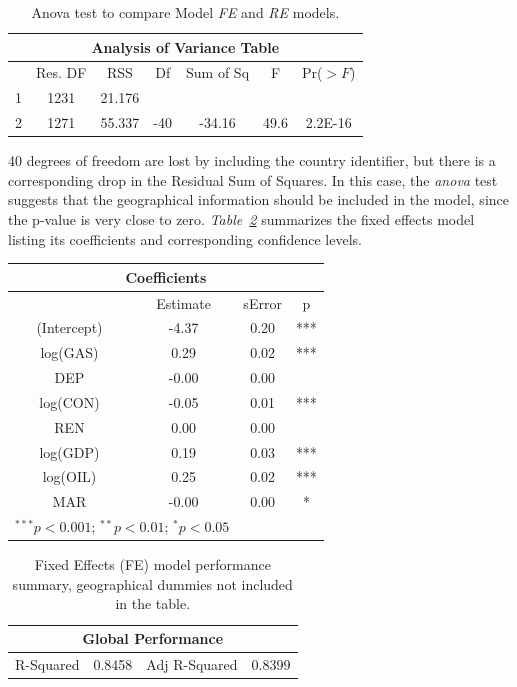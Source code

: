 \documentclass[a4paper,12pt]{book}
\begin{document}
\bigskip
\begin{table}[tb]
\begin{center}
\begin{tabular}{|c|c|c|c|c|c|c|}
\hline
\multicolumn{7}{|c|}{Analysis of Variance Table}\\
\hline
&Res. DF&RSS&Df&Sum of Sq&F&Pr($>F$)\\
\hline
1&1231&21.176&&&&\\
2&1271&55.337&-40&-34.16&49.6&2.2E-16\\
\hline
\end{tabular}
\caption{Anova test to compare Model \textit{FE} and \textit{RE} models.}
\label{Tab:12}
\end{center}
\end{table}

40 degrees of freedom are lost by including the country identifier, but there is a corresponding drop in the Residual Sum of Squares. In this case, the \textit{anova} test suggests that the geographical information should be included in the model, since the p-value is very close to zero. \textit{Table~\ref{Tab:fef}} summarizes the fixed effects model listing its coefficients and corresponding confidence levels.

\begin{table}[tb]
\begin{center}
\begin{tabular}{|c|c|c|c|}
\hline
\multicolumn{4}{|c|}{Coefficients}\\
\hline
&Estimate&sError&p\\
\hline
(Intercept) & -4.37 & 0.20&*** \\
log(GAS)&0.29&0.02&***\\
DEP&-0.00&0.00&\\
log(CON)&-0.05&0.01&***\\
REN&0.00&0.00&\\
log(GDP)&0.19&0.03&***\\
log(OIL)&0.25&0.02&***\\
MAR&-0.00&0.00&* \\
\hline
\multicolumn{2}{l}{\scriptsize{$^{***}p<0.001$; $^{**}p<0.01$; $^{*}p<0.05$}}
\end{tabular}
\end{center}
\end{table}
\begin{table}[tb]
\begin{center}
\begin{tabular}{|c|c|c|c|}
\hline
\multicolumn{4}{|c|}{Global Performance}\\
\hline
R-Squared&0.8458&Adj R-Squared&0.8399\\
\hline
\end{tabular}
\caption{Fixed Effects (FE) model performance summary, geographical dummies not included in the table.}
\label{Tab:fef}
\end{center}
\end{table}
\end{document}

